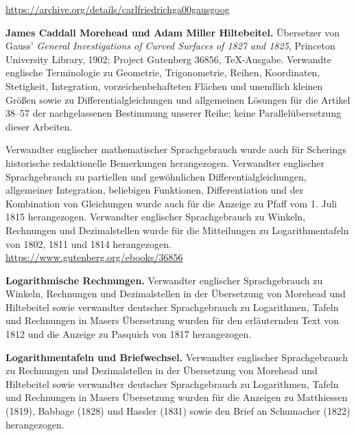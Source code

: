 \url{https://archive.org/details/carlfriedrichga00gausgoog}
\par\medskip\textbf{James Caddall Morehead und Adam Miller Hiltebeitel.} Übersetzer von Gauss’ \emph{General Investigations of Curved Surfaces of 1827 and 1825}, Princeton University Library, 1902; Project Gutenberg 36856, TeX-Ausgabe. Verwandte englische Terminologie zu Geometrie, Trigonometrie, Reihen, Koordinaten, Stetigkeit, Integration, vorzeichenbehafteten Flächen und unendlich kleinen Größen sowie zu Differentialgleichungen und allgemeinen Lösungen für die Artikel 38–57 der nachgelassenen Bestimmung unserer Reihe; keine Parallelübersetzung dieser Arbeiten.\par
 Verwandter englischer mathematischer Sprachgebrauch wurde auch für Scherings historische redaktionelle Bemerkungen herangezogen. Verwandter englischer Sprachgebrauch zu partiellen und gewöhnlichen Differentialgleichungen, allgemeiner Integration, beliebigen Funktionen, Differentiation und der Kombination von Gleichungen wurde auch für die Anzeige zu Pfaff vom 1. Juli 1815 herangezogen. Verwandter englischer Sprachgebrauch zu Winkeln, Rechnungen und Dezimalstellen wurde für die Mitteilungen zu Logarithmentafeln von 1802, 1811 und 1814 herangezogen.
\url{https://www.gutenberg.org/ebooks/36856}
\par\endgroup\clearpage\thispagestyle{empty}\begingroup\fontsize{9}{9.5}\selectfont\raggedright
{}\medskip

\par\medskip\textbf{Logarithmische Rechnungen.} Verwandter englischer Sprachgebrauch zu Winkeln, Rechnungen und Dezimalstellen in der Übersetzung von Morehead und Hiltebeitel sowie verwandter deutscher Sprachgebrauch zu Logarithmen, Tafeln und Rechnungen in Masers Übersetzung wurden für den erläuternden Text von 1812 und die Anzeige zu Pasquich von 1817 herangezogen.

\par\medskip\textbf{Logarithmentafeln und Briefwechsel.} Verwandter englischer Sprachgebrauch zu Rechnungen und Dezimalstellen in der Übersetzung von Morehead und Hiltebeitel sowie verwandter deutscher Sprachgebrauch zu Logarithmen, Tafeln und Rechnungen in Masers Übersetzung wurden für die Anzeigen zu Matthiessen (1819), Babbage (1828) und Hassler (1831) sowie den Brief an Schumacher (1822) herangezogen.

